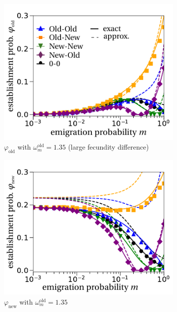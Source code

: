 \documentclass[11pt]{article}
\begin{document}
\begin{figure}[h!]
	\centering
	\begin{subfigure}{.5\textwidth}
		\centering
		\includegraphics[width=\linewidth]{figS6a.pdf}
		\caption{$\varphi_{\text{old}}$ with $\omega^\text{old}_m=1.35$ (large fecundity difference)}
	\end{subfigure}%
	\begin{subfigure}{.5\textwidth}
		\centering
		\includegraphics[width=\linewidth]{figS6b.pdf}
		\caption{$\varphi_{\text{new}}$ with $\omega^\text{old}_m=1.35$}
	\end{subfigure}
	\begin{subfigure}{.5\textwidth}

\end{subfigure}
\end{figure}
\end{document}
